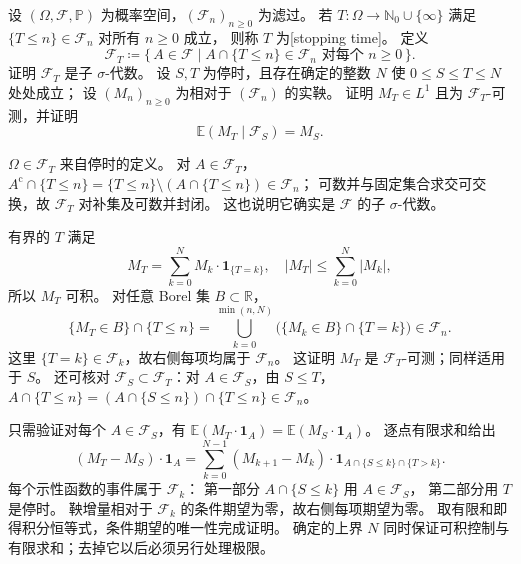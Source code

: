\begin{exercise}\label{b1:ex:31-bounded-optional-sampling}
设 \((\Omega,\mathcal F,\mathbb P)\) 为概率空间，\((\mathcal F_n)_{n\geq0}\) 为滤过。
若 \(T:\Omega\to\mathbb N_0\cup\{\infty\}\) 满足
\(\{T\leq n\}\in\mathcal F_n\) 对所有 \(n\geq0\) 成立，
则称 \(T\) 为[stopping time]。
定义
\[
 \mathcal F_T\coloneqq
 \{\,A\in\mathcal F\mid A\cap\{T\leq n\}\in\mathcal F_n
                  \text{ 对每个 }n\geq0\,\}.
\]
证明 \(\mathcal F_T\) 是子 \(\sigma\)-代数。
设 \(S,T\) 为停时，且存在确定的整数 \(N\) 使
\(0\leq S\leq T\leq N\) 处处成立；
设 \((M_n)_{n\geq0}\) 为相对于 \((\mathcal F_n)\) 的实鞅。
证明 \(M_T\in L^1\) 且为 \(\mathcal F_T\)-可测，并证明
\[
 \mathbb E(M_T\mid\mathcal F_S)=M_S.
\]
\end{exercise}
\begin{solution}
\(\Omega\in\mathcal F_T\) 来自停时的定义。
对 \(A\in\mathcal F_T\)，
\(A^{\mathrm c}\cap\{T\leq n\}=\{T\leq n\}\setminus(A\cap\{T\leq n\})\in\mathcal F_n\)；
可数并与固定集合求交可交换，故 \(\mathcal F_T\) 对补集及可数并封闭。
这也说明它确实是 \(\mathcal F\) 的子 \(\sigma\)-代数。

有界的 \(T\) 满足
\[
 M_T=\sum_{k=0}^N M_k\cdot\mathbf1_{\{T=k\}},\quad
 |M_T|\leq\sum_{k=0}^N|M_k|,
\]
所以 \(M_T\) 可积。
对任意 Borel 集 \(B\subset\mathbb R\)，
\[
 \{M_T\in B\}\cap\{T\leq n\}
 =\bigcup_{k=0}^{\min(n,N)}\bigl(\{M_k\in B\}\cap\{T=k\}\bigr)\in\mathcal F_n.
\]
这里 \(\{T=k\}\in\mathcal F_k\)，故右侧每项均属于 \(\mathcal F_n\)。
这证明 \(M_T\) 是 \(\mathcal F_T\)-可测；同样适用于 \(S\)。
还可核对 \(\mathcal F_S\subset\mathcal F_T\)：对 \(A\in\mathcal F_S\)，由 \(S\leq T\)，
\(A\cap\{T\leq n\}=(A\cap\{S\leq n\})\cap\{T\leq n\}\in\mathcal F_n\)。

只需验证对每个 \(A\in\mathcal F_S\)，有
\(\mathbb E(M_T\cdot\mathbf1_A)=\mathbb E(M_S\cdot\mathbf1_A)\)。
逐点有限求和给出
\[
 (M_T-M_S)\cdot\mathbf1_A
 =\sum_{k=0}^{N-1}(M_{k+1}-M_k)\cdot
       \mathbf1_{A\cap\{S\leq k\}\cap\{T>k\}}.
\]
每个示性函数的事件属于 \(\mathcal F_k\)：
第一部分 \(A\cap\{S\leq k\}\) 用 \(A\in\mathcal F_S\)，
第二部分用 \(T\) 是停时。
鞅增量相对于 \(\mathcal F_k\) 的条件期望为零，故右侧每项期望为零。
取有限和即得积分恒等式，条件期望的唯一性完成证明。
确定的上界 \(N\) 同时保证可积控制与有限求和；去掉它以后必须另行处理极限。
\end{solution}

